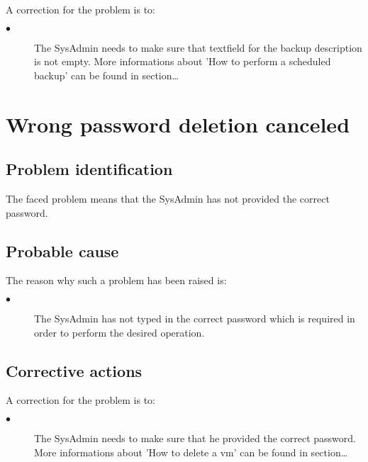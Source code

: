 A correction for the problem is to:\\
\begin{description}
\item[$\bullet$] The SysAdmin needs to make sure that textfield for the backup
description is not empty. More informations about 'How to perform a scheduled
backup' can be found in section\ldots

\end{description}










\section{Wrong password deletion canceled} 

\subsection{Problem identification}
The faced problem means that the SysAdmin has not provided the correct password.

\subsection{Probable cause}

The reason why such a problem has been raised is:\\
\begin{description}
\item[$\bullet$] The SysAdmin has not typed in the correct password which is
required in order to perform the desired operation.
\end{description}


\subsection{Corrective actions}

A correction for the problem is to:\\
\begin{description}
\item[$\bullet$] The SysAdmin needs to make sure that he provided the correct
password. More informations about 'How to delete a vm' can be found in
section\ldots

\end{description}






